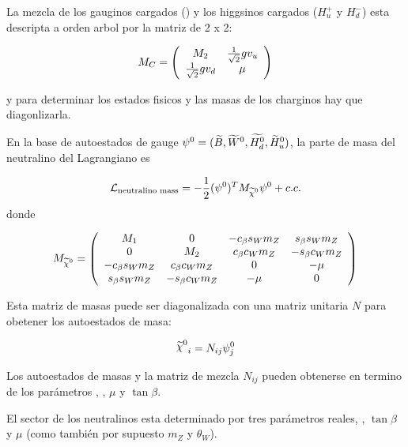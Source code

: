 La mezcla de los gauginos cargados (\winopm) y los higgsinos
cargados ($H_u^+$ y $H_d^-$) esta descripta a orden arbol por
la matriz de 2 x 2:

\begin{equation}
  M_{C} = \left(
  \begin{array}{cc}
    M_{2} & \frac{1}{\sqrt{2}} g v_u \\
    \frac{1}{\sqrt{2}} g v_d & \mu \\
  \end{array}
  \right)
\end{equation}

y para determinar los estados fisicos y las masas de los
charginos hay que diagonlizarla.


En la base de autoestados de gauge $\psi^0 = (\widetilde{B}, \widetilde{W}^0, \widetilde{H_d^0}, \widetilde{H}_u^0)$,
la parte de masa del neutralino del Lagrangiano es

\begin{equation}
  \mathcal{L}_\text{neutralino mass} = -\frac{1}{2} (\psi^0)^T M_{\nino} \psi^0 + c.c.
\end{equation}
%
donde

\begin{equation}
  M_{\nino} = \left(
  \begin{array}{cccc}
    \M{1} & 0 & -c_\beta s_W m_Z &  s_\beta s_W m_Z \\
    0 & \M{2} & c_\beta c_W m_Z & -s_\beta c_W m_Z \\

    -c_\beta s_W m_Z & c_\beta c_W m_Z & 0 & -\mu \\
    s_\beta s_W m_Z & -s_\beta c_W m_Z & -\mu & 0 \\
  \end{array}
  \right)
\end{equation}

Esta matriz de masas puede ser diagonalizada con una matriz unitaria $N$ para obetener los autoestados
de masa:

\begin{equation}
  \nino_i = N_{ij} \psi^0_j
\end{equation}

Los autoestados de masas y la matriz de mezcla $N_{ij}$ pueden obtenerse en termino de los parámetros
, , $\mu$ y $\tan\beta$.

El sector de los neutralinos esta determinado por tres parámetros reales, , $\tan\beta$ y
$\mu$ (como también por supuesto $m_Z$ y $\theta_W$).

